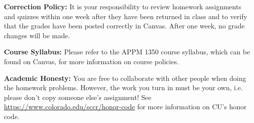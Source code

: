\documentclass[10pt]{report}
\begin{document}
\textbf{Correction Policy:} It is your responsibility to review homework assignments and quizzes within one week after they have been returned in class and to verify that the grades have been posted correctly in Canvas. After one week, no grade changes will be made.

\textbf{Course Syllabus:} Please refer to the APPM 1350 course syllabus, which can be found on Canvas, for more information on course policies.

\textbf{Academic Honesty:} You are free to collaborate with other people when doing the homework problems.  However, the work you turn in must be your own, i.e. please don't copy someone else's assignment!  See \url{https://www.colorado.edu/sccr/honor-code} for more information on CU's honor code.
\end{document}
